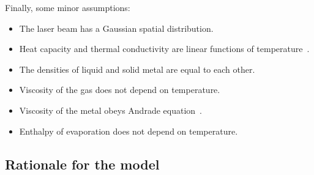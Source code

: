 \documentclass[final]{elsarticle} %
\begin{document}
Finally, some minor assumptions:
\begin{itemize}
    \item The laser beam has a Gaussian spatial distribution.
    \item Heat capacity and thermal conductivity are linear functions of temperature~\cite{le2019study}.
    \item The densities of liquid and solid metal are equal to each other.
    \item Viscosity of the gas does not depend on temperature.
    \item Viscosity of the metal obeys Andrade equation~\cite{andrade1930viscosity}.
    \item Enthalpy of evaporation does not depend on temperature.
\end{itemize}

\subsection{Rationale for the model}
\end{document}
